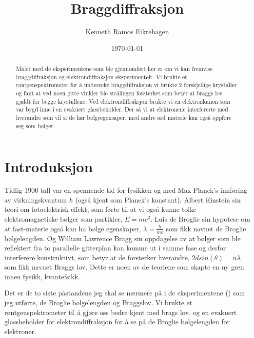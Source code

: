 \documentclass[norsk,a4paper,12pt]{article}
\title{Braggdiffraksjon}
\author{Kenneth Ramos Eikrehagen}
\date{\today}
\begin{document}
\renewcommand{\abstractname}{\large Sammendrag}
\renewcommand{\contentsname}{\LARGE Innhold}
\renewcommand{\listfigurename}{\Large Figur liste}
\renewcommand{\listtablename}{\Large Tabell liste}
\renewcommand\appendixpagename{Appendix}
\renewcommand\appendixtocname{Appendix}

\maketitle
\newpage
\tableofcontents
\listoffigures
\listoftables
\newpage





\begin{abstract}
Målet med de eksperimentene som ble gjennomført her er om vi kan fremvise braggdiffraksjon og elektrondiffraksjon eksperimentelt. Vi brukte et røntgenspektrometer for å undersøke braggdiffraksjon vi brukte 2 forskjellige krystaller og fant at ved noen gitte vinkler ble strålingen forsterket som betyr at braggs lov gjaldt for begge krystallene. Ved elektrondiffraksjon brukte vi en elektronkanon som var bygd inne i en evakuert glassbeholder. Der så vi at elektronene interfererte med hverandre som vil si de har bølgeegensaper, med andre ord materie kan også oppføre seg som bølger.
\end{abstract}



\section{Introduksjon}
Tidlig 1900 tall var en spennende tid for fysikken og med Max Planck's innføring av virkningskvantum $h$ (også kjent som Planck's konstant). Albert Einstein sin teori om fotoelektrisk effekt, som førte til at vi også kunne tolke elektromagnetiske bølger som partikler, $E = mc^2$. Luis de Broglie sin hypotese om at fast-materie også kan ha bølge egenskaper, $\lambda = \frac{h}{mv}$ som fikk navnet de Broglie bølgelengden. Og William Lawrence Bragg sin oppdagelse av at bølger som ble reflektert fra to parallelle gitterplan kan komme ut i samme fase og derfor interferere konstruktivt, som betyr at de forsterker hverandre, $2dsin(\theta)=n\lambda$ som fikk navnet Braggs lov. Dette er noen av de teoriene som skapte en ny gren innen fysikk, kvantefsikk. 

Det er de to siste påstandene jeg skal se nærmere på i de eksperimentene (\cite{opg}) som jeg utførte, de Broglie bølgelengden og Braggslov. Vi brukte et røntgenspektrometer til å gjøre oss bedre kjent med brags lov, og en evakuert glassbeholder for elektrondiffraksjon for å se på de Broglie bølgelengden for elektroner.
\end{document}
